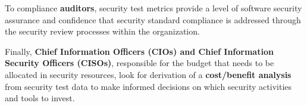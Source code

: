 			To compliance {\bf auditors}, security test metrics provide a level of software security assurance and
			confidence that security standard compliance is addressed through the security review processes 
			within the organization.

			Finally, {\bf Chief Information Officers (CIOs) and Chief Information Security Officers (CISOs)}, 
			responsible for the budget that needs to be allocated in security resources, look for derivation 
			of a {\bf cost/benefit analysis} from security test data to make informed decisions on which security 
			activities and tools to invest. 











